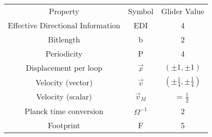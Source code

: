 \documentclass[notitlepage]{article}
\begin{document}
\begin{appendices}
\begin{center}
\begin{tabular}{ c c c }
\hline
 Property & Symbol & Glider Value \\ [0.5ex]
 Effective Directional Information & EDI & 4 \\ 
 Bitlength & b & 2 \\ 
 Periodicity & P & 4 \\  
 Displacement per loop  & $\vec{x}$ & $(\pm 1, \pm 1)$    \\
 Velocity (vector) & $\vec{v}$ & $(\pm \frac{1}{4} ,\pm \frac{1}{4})$    \\
 Velocity (scalar) & $\vec{v}_M$  & = $\frac{1}{2}$ \\
 Planck time conversion & $\Omega^{-1} $ & 2\\
 Footprint 	& F & 5
\end{tabular}

\end{center}
\end{appendices}




\end{document}

